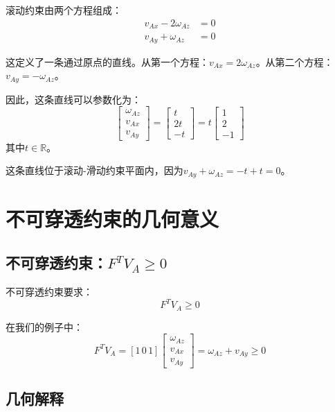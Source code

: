 \documentclass[12pt,a4paper]{article}
\begin{document}
滚动约束由两个方程组成：
\begin{align}
v_{Ax} - 2\omega_{Az} &= 0 \\
v_{Ay} + \omega_{Az} &= 0
\end{align}

这定义了一条通过原点的直线。从第一个方程：$v_{Ax} = 2\omega_{Az}$。从第二个方程：$v_{Ay} = -\omega_{Az}$。

因此，这条直线可以参数化为：
\begin{equation}
\begin{bmatrix} \omega_{Az} \\ v_{Ax} \\ v_{Ay} \end{bmatrix} = \begin{bmatrix} t \\ 2t \\ -t \end{bmatrix} = t \begin{bmatrix} 1 \\ 2 \\ -1 \end{bmatrix}
\end{equation}
其中$t \in \mathbb{R}$。

这条直线位于滚动-滑动约束平面内，因为$v_{Ay} + \omega_{Az} = -t + t = 0$。

\section{不可穿透约束的几何意义}

\subsection{不可穿透约束：$F^T V_A \geq 0$}

不可穿透约束要求：
\begin{equation}
F^T V_A \geq 0
\end{equation}

在我们的例子中：
\begin{equation}
F^T V_A = [1 \, 0 \, 1] \begin{bmatrix} \omega_{Az} \\ v_{Ax} \\ v_{Ay} \end{bmatrix} = \omega_{Az} + v_{Ay} \geq 0
\end{equation}

\subsection{几何解释}
\end{document}
